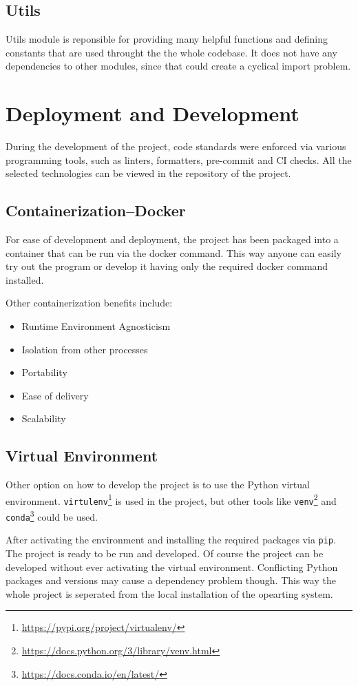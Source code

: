 \subsection*{Utils}
Utils module is reponsible for providing many helpful functions and defining constants that are used throught the the whole codebase. It does not have any dependencies to other modules, since that could create a cyclical import problem.

\section{Deployment and Development}
During the development of the project, code standards were enforced via various programming tools, such as linters, formatters, pre-commit and CI checks. All the selected technologies can be viewed in the repository of the project.

\subsection*{Containerization--Docker}
For ease of development and deployment, the project has been packaged into a container that can be run via the docker command. This way anyone can easily try out the program or develop it having only the required docker command installed.

Other containerization benefits include:
\begin{itemize}
    \item Runtime Environment Agnosticism
    \item Isolation from other processes
    \item Portability
    \item Ease of delivery
    \item Scalability
\end{itemize}

\subsection*{Virtual Environment}
Other option on how to develop the project is to use the Python virtual environment. \texttt{virtulenv}\footnote{\url{https://pypi.org/project/virtualenv/}} is used in the project, but other tools like \texttt{venv}\footnote{\url{https://docs.python.org/3/library/venv.html}} and \texttt{conda}\footnote{\url{https://docs.conda.io/en/latest/}} could be used.

After activating the environment and installing the required packages via \texttt{pip}. The project is ready to be run and developed. Of course the project can be developed without ever activating the virtual environment. Conflicting Python packages and versions may cause a dependency problem though. This way the whole project is seperated from the local installation of the opearting system.

